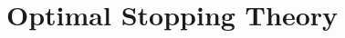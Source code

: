 \documentclass[11pt]{article}
\begin{document}
\section{Optimal Stopping Theory}



\newpage
\printbibliography[heading=bibintoc]

\end{document}
